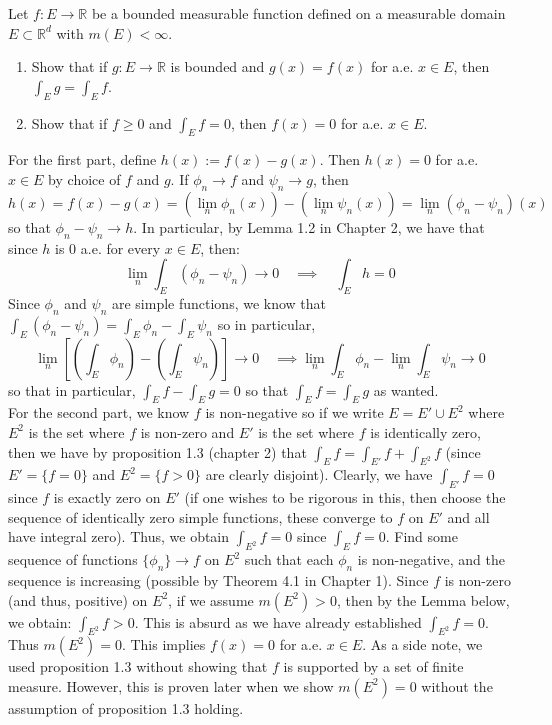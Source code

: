 \documentclass[12pt]{article}
\newcommand{\R}{\mathbb{R}}
\newenvironment{solution}[2][Solution]{\begin{trivlist}
\item[\hskip \labelsep {\bfseries #1}]}{\end{trivlist}}
\newenvironment{problem}[2][Problem]{\begin{trivlist}
\item[\hskip \labelsep {\bfseries #1}\hskip \labelsep {\bfseries #2.}]}{\end{trivlist}}
\begin{document}
\begin{problem}{4}
    Let $f:E\to\R$ be a bounded measurable function defined on a measurable domain $E\subset\R^d$ with $m(E)<\infty$.
    \begin{enumerate}
        \item Show that if $g:E\to\R$ is bounded and $g(x)=f(x)$ for a.e. $x\in E$, then $\int_E g = \int_E f$.
        \item Show that if $f\geq 0$ and $\int_E f = 0$, then $f(x) = 0$ for a.e. $x\in E$.
    \end{enumerate}
\end{problem}

\begin{solution}
    FFor the first part, define $h(x) := f(x) - g(x)$. Then $h(x) = 0$ for a.e. $x\in E$ by choice of $f$ and $g$.
    If $\phi_n \to f$ and $\psi_n \to g$, then 
    \[ h(x) = f(x) - g(x) = (\lim_n \phi_n(x)) - (\lim_n \psi_n(x)) = \lim_n (\phi_n - \psi_n)(x) \]
    so that $\phi_n - \psi_n \to h$. In particular, by Lemma 1.2 in Chapter 2, we have that since $h$ is 0 a.e. for every $x\in E$,
    then:
    \[ \lim_n \int_E (\phi_n - \psi_n) \to 0 \quad \implies \quad \int_E h = 0 \]
    Since $\phi_n$ and $\psi_n$ are simple functions, we know that $\int_E (\phi_n - \psi_n) = \int_E \phi_n - \int_E \psi_n$ so
    in particular,
    \[ \lim_n [(\int_E \phi_n) - (\int_E \psi_n)] \to 0 \quad \implies \lim_n \int_E \phi_n - \lim_n \int_E \psi_n \to 0\]
    so that in particular, $\int_E f - \int_E g = 0$ so that $\int_E f = \int_E g$ as wanted.\\

    For the second part, we know $f$ is non-negative so if we write $E = E' \cup E^2$ where $E^2$ is the set where
    $f$ is non-zero and $E'$ is the set where $f$ is identically zero, then we have by proposition 1.3 (chapter 2) that 
    $\int_E f = \int_{E'} f + \int_{E^2} f$ (since $E' = \{f = 0\}$ and $E^2 = \{f > 0\}$ are clearly disjoint).
    Clearly, we have $\int_{E'} f = 0$ since $f$ is exactly zero on $E'$ (if one wishes to be rigorous in this, 
    then choose the sequence of identically zero simple functions, these converge to $f$ on $E'$ and all have integral zero). 
    Thus, we obtain $\int_{E^2} f = 0$ since $\int_E f = 0$. Find some sequence of functions $\{\phi_n\} \to f$ on $E^2$ such that
    each $\phi_n$ is non-negative, and the sequence is increasing (possible by Theorem 4.1 in Chapter 1). Since $f$ is non-zero
    (and thus, positive) on $E^2$, if we assume $m(E^2)>0$, then by the Lemma below, we obtain: $\int_{E^2} f > 0$. This is absurd
    as we have already established $\int_{E^2} f = 0$. Thus $m(E^2) = 0$. This implies $f(x) = 0$ for a.e. $x\in E$. As a side
    note, we used proposition 1.3 without showing that $f$ is supported by a set of finite measure. However, this is proven later
    when we show $m(E^2) = 0$ without the assumption of proposition 1.3 holding.
\end{solution}
\pagebreak
\end{document}
